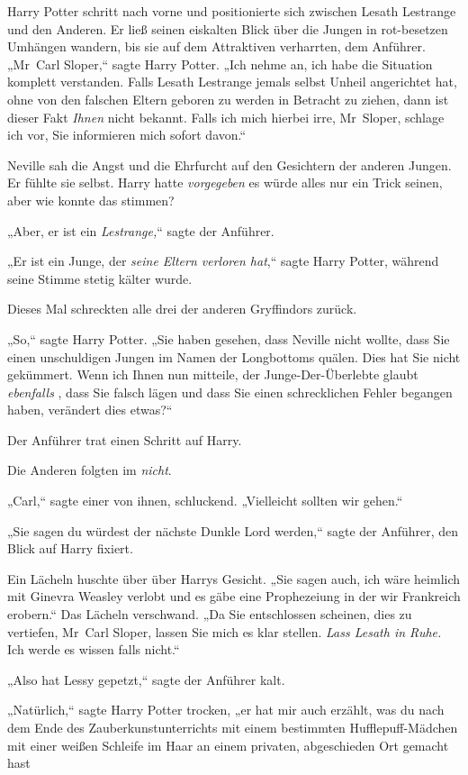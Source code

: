 {Harry Potter schritt nach vorne und positionierte sich zwischen Lesath Lestrange und den Anderen. Er ließ seinen eiskalten Blick über die Jungen in rot-besetzen Umhängen wandern, bis sie auf dem Attraktiven verharrten, dem Anführer. „Mr~Carl Sloper,“ sagte Harry Potter. „Ich nehme an, ich habe die Situation komplett verstanden. Falls Lesath Lestrange jemals selbst Unheil angerichtet hat, ohne von den falschen Eltern geboren zu werden in Betracht zu ziehen, dann ist dieser Fakt \emph{Ihnen} nicht bekannt. Falls ich mich hierbei irre, Mr~Sloper, schlage ich vor, Sie informieren mich sofort davon.“

Neville sah die Angst und die Ehrfurcht auf den Gesichtern der anderen Jungen. Er fühlte sie selbst. Harry hatte \emph{vorgegeben} es würde alles nur ein Trick seinen, aber wie konnte das stimmen?

„Aber, er ist ein \emph{Lestrange,}“ sagte der Anführer.

„Er ist ein Junge, der \emph{seine Eltern verloren hat},“ sagte Harry Potter, während seine Stimme stetig kälter wurde.

Dieses Mal schreckten alle drei der anderen Gryffindors zurück.

„So,“ sagte Harry Potter. „Sie haben gesehen, dass Neville nicht wollte, dass Sie einen unschuldigen Jungen im Namen der Longbottoms quälen. Dies hat Sie nicht gekümmert. Wenn ich Ihnen nun mitteile, der Junge-Der-Überlebte glaubt \emph{ebenfalls} , dass Sie falsch lägen und dass Sie einen schrecklichen Fehler begangen haben, verändert dies etwas?“

Der Anführer trat einen Schritt auf Harry.

Die Anderen folgten im \emph{nicht}.

„Carl,“ sagte einer von ihnen, schluckend. „Vielleicht sollten wir gehen.“

„Sie sagen du würdest der nächste Dunkle Lord werden,“ sagte der Anführer, den Blick auf Harry fixiert.

Ein Lächeln huschte über über Harrys Gesicht. „Sie sagen auch, ich wäre heimlich mit Ginevra Weasley verlobt und es gäbe eine Prophezeiung in der wir Frankreich erobern.“ Das Lächeln verschwand. „Da Sie entschlossen scheinen, dies zu vertiefen, Mr~Carl Sloper, lassen Sie mich es klar stellen. \emph{Lass Lesath in Ruhe.} Ich werde es wissen falls nicht.“

„Also hat Lessy gepetzt,“ sagte der Anführer kalt.

„Natürlich,“ sagte Harry Potter trocken, „er hat mir auch erzählt, was du nach dem Ende des Zauberkunstunterrichts mit einem bestimmten Hufflepuff-Mädchen mit einer weißen Schleife im Haar an einem privaten, abgeschieden Ort gemacht hast \later

}

